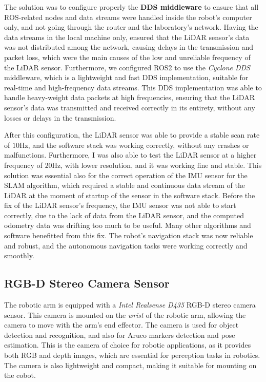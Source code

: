 The solution was to configure properly the \textbf{DDS middleware} to ensure that all ROS-related nodes and data streams
were handled inside the robot's computer only, and not going through the router and the laboratory's network.
Having the data streams in the local machine only, ensured that the LiDAR sensor's data was not distributed 
among the network, causing delays in the transmission and packet loss, which were the main causes of the low and unreliable
frequency of the LiDAR sensor. Furthermore, we configured ROS2 to use the \textit{Cyclone DDS} middleware, which is a lightweight
and fast DDS implementation, suitable for real-time and high-frequency data streams. This DDS implementation was able to handle
heavy-weight data packets at high frequencies, ensuring that the LiDAR sensor's data was transmitted and received correctly
in its entirety, without any losses or delays in the transmission.

After this configuration, the LiDAR sensor was able to provide a stable scan rate of $10$Hz,
and the software stack was working correctly, without any crashes or malfunctions.
Furthermore, I was also able to test the LiDAR sensor at a higher frequency of $20$Hz, 
with lower resolution, and it was working fine and stable.
This solution was essential also for the correct operation of the IMU sensor for the SLAM algorithm, which required
a stable and continuous data stream of the LiDAR at the moment of startup of the sensor in the software stack. Before the 
fix of the LiDAR sensor's frequency, the IMU sensor was not able to start correctly, due to the lack of data
from the LiDAR sensor, and the computed odometry data was drifting too much to be useful.
Many other algorithms and software benefitted from this fix. The robot's navigation stack was now reliable and robust,
and the autonomous navigation tasks were working correctly and smoothly.

\subsection{RGB-D Stereo Camera Sensor}

The robotic arm is equipped with a \textit{Intel Realsense D435} RGB-D stereo camera sensor.
This camera is mounted on the \textit{wrist} of the robotic arm, allowing the camera to move with the arm's end effector.
The camera is used for object detection and recognition, and also for Aruco markers detection and pose estimation.
This is the camera of choice for robotic applications, as it provides both RGB and depth images, which are essential
for perception tasks in robotics. The camera is also lightweight and compact, making it suitable for mounting on the cobot.

